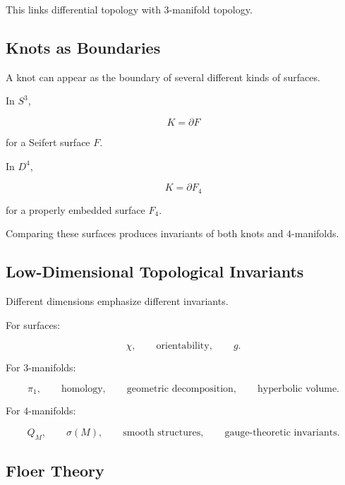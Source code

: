 This links differential topology with \(3\)-manifold topology.

\subsection{Knots as Boundaries}
\label{subsec:knots-as-boundaries}

A knot can appear as the boundary of several different kinds of surfaces.

In \(S^3\),

\[
\boxed{
K=\partial F
}
\]

for a Seifert surface \(F\).

In \(D^4\),

\[
\boxed{
K=\partial F_4
}
\]

for a properly embedded surface \(F_4\).

Comparing these surfaces produces invariants of both knots and
\(4\)-manifolds.

\subsection{Low-Dimensional Topological Invariants}
\label{subsec:low-dimensional-invariants}

Different dimensions emphasize different invariants.

For surfaces:

\[
\boxed{
\chi,
\qquad
\text{orientability},
\qquad
g.
}
\]

For \(3\)-manifolds:

\[
\boxed{
\pi_1,
\qquad
\text{homology},
\qquad
\text{geometric decomposition},
\qquad
\text{hyperbolic volume}.
}
\]

For \(4\)-manifolds:

\[
\boxed{
Q_M,
\qquad
\sigma(M),
\qquad
\text{smooth structures},
\qquad
\text{gauge-theoretic invariants}.
}
\]

\subsection{Floer Theory}
\label{subsec:floer-theory-low-dimensional}

